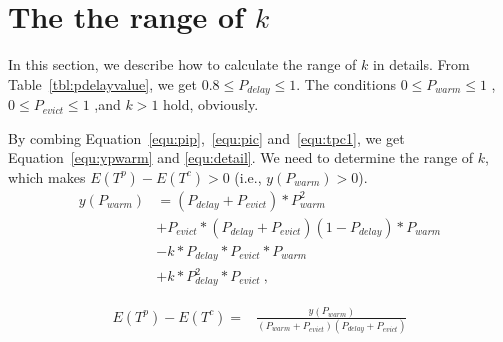 \newpage
\section{The the range of $k$}
\label{appendixa}
In this section, we describe how to calculate the range of $k$ in details.
From Table~\ref{tbl:pdelayvalue}, we get $0.8 \leq P_{delay} \leq 1$.
The conditions $0 \leq P_{warm} \leq 1$ , $0 \leq P_{evict} \leq 1$ ,and $k > 1$ hold, obviously.

By combing Equation~\ref{equ:pip},~\ref{equ:pic} and~\ref{equ:tpc1}, we get Equation~\ref{equ:ypwarm} and \ref{equ:detail}.
We need to determine the range of  $k$, which makes $E(T^{p}) - E(T^{c})>0$ (i.e., $y(P_{warm}) > 0$).
\begin{equation}
\label{equ:ypwarm}
\begin{split}
y(P_{warm}) &= (P_{delay}+P_{evict})*P_{warm}^{2} \\
& +  P_{evict}*(P_{delay}+P_{evict})(1-P_{delay})*P_{warm}\\
& - k*P_{delay}*P_{evict}*P_{warm} \\
& + k*P_{delay}^{2}*P_{evict} \ ,
\end{split}\end{equation}

\begin{equation}
\label{equ:detail}
\begin{split}
E(T^{p}) - E(T^{c}) = &\frac{y(P_{warm})}{(P_{warm}+P_{evict})(P_{delay}+P_{evict})}
\end{split}\end{equation}

